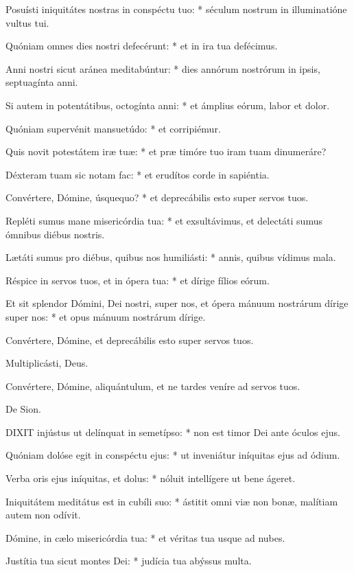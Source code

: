 Posuísti iniquitátes nostras in conspéctu tuo: * séculum nostrum in illuminatióne vultus tui.

Quóniam omnes dies nostri defecérunt: * et in ira tua defécimus.

Anni nostri sicut aránea meditabúntur: * dies annórum nostrórum in ipsis, septuagínta anni.

Si autem in potentátibus, octogínta anni: * et ámplius eórum, labor et dolor.

Quóniam supervénit mansuetúdo: * et corripiémur.

Quis novit potestátem iræ tuæ: * et præ timóre tuo iram tuam dinumeráre?

Déxteram tuam sic notam fac: * et erudítos corde in sapiéntia.

Convértere, Dómine, úsquequo? * et deprecábilis esto super servos tuos.

Repléti sumus mane misericórdia tua: * et exsultávimus, et delectáti sumus ómnibus diébus nostris.

Lætáti sumus pro diébus, quibus nos humiliásti: * annis, quibus vídimus mala.

Réspice in servos tuos, et in ópera tua: * et dírige fílios eórum.

Et sit splendor Dómini, Dei nostri, super nos, et ópera mánuum nostrárum dírige super nos: * et opus mánuum nostrárum dírige.

 Convértere, Dómine, et deprecábilis esto super servos tuos.

 Multiplicásti, Deus.

  Convértere, Dómine, aliquántulum, et ne tardes veníre ad servos tuos.

 De Sion.


\lettrine[lines=2]{D}{IXIT} injústus ut delínquat in semetípso: * non est timor Dei ante óculos ejus.

Quóniam dolóse egit in conspéctu ejus: * ut inveniátur iníquitas ejus ad ódium.

Verba oris ejus iníquitas, et dolus: * nóluit intellígere ut bene ágeret.

Iniquitátem meditátus est in cubíli suo: * ástitit omni viæ non bonæ, malítiam autem non odívit.

Dómine, in cælo misericórdia tua: * et véritas tua usque ad nubes.

Justítia tua sicut montes Dei: * judícia tua abýssus multa.

